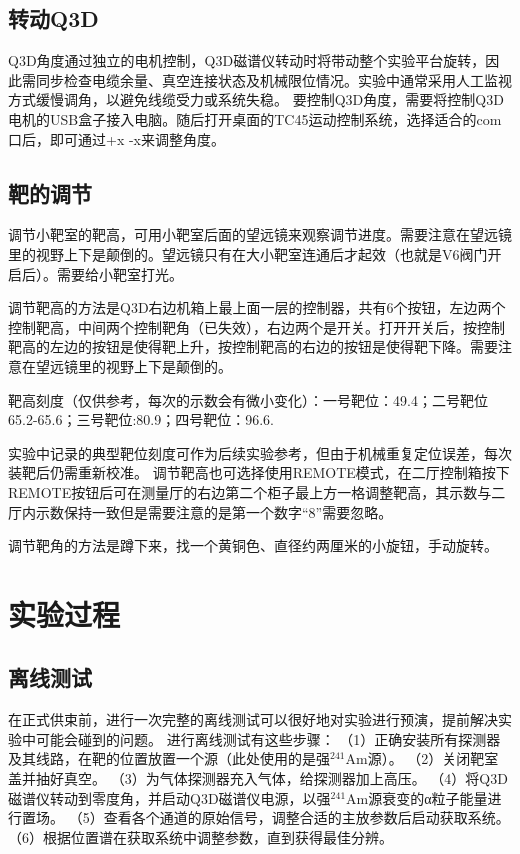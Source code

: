 \subsection{转动Q3D}
Q3D角度通过独立的电机控制，Q3D磁谱仪转动时将带动整个实验平台旋转，因此需同步检查电缆余量、真空连接状态及机械限位情况。实验中通常采用人工监视方式缓慢调角，以避免线缆受力或系统失稳。
要控制Q3D角度，需要将控制Q3D电机的USB盒子接入电脑。随后打开桌面的TC45运动控制系统，选择适合的com口后，即可通过+x -x来调整角度。
\subsection{靶的调节}


调节小靶室的靶高，可用小靶室后面的望远镜来观察调节进度。需要注意在望远镜里的视野上下是颠倒的。望远镜只有在大小靶室连通后才起效（也就是V6阀门开启后）。需要给小靶室打光。

调节靶高的方法是Q3D右边机箱上最上面一层的控制器，共有6个按钮，左边两个控制靶高，中间两个控制靶角（已失效），右边两个是开关。打开开关后，按控制靶高的左边的按钮是使得靶上升，按控制靶高的右边的按钮是使得靶下降。需要注意在望远镜里的视野上下是颠倒的。

靶高刻度（仅供参考，每次的示数会有微小变化）：一号靶位：49.4；二号靶位65.2-65.6；三号靶位:80.9；四号靶位：96.6.

实验中记录的典型靶位刻度可作为后续实验参考，但由于机械重复定位误差，每次装靶后仍需重新校准。
调节靶高也可选择使用REMOTE模式，在二厅控制箱按下REMOTE按钮后可在测量厅的右边第二个柜子最上方一格调整靶高，其示数与二厅内示数保持一致但是需要注意的是第一个数字“8”需要忽略。

调节靶角的方法是蹲下来，找一个黄铜色、直径约两厘米的小旋钮，手动旋转。
\section{实验过程}
\subsection{离线测试}
在正式供束前，进行一次完整的离线测试可以很好地对实验进行预演，提前解决实验中可能会碰到的问题。
进行离线测试有这些步骤：
（1）正确安装所有探测器及其线路，在靶的位置放置一个源（此处使用的是强$^{241}\mathrm{Am}$源）。
（2）关闭靶室盖并抽好真空。
（3）为气体探测器充入气体，给探测器加上高压。
（4）将Q3D磁谱仪转动到零度角，并启动Q3D磁谱仪电源，以强$^{241}\mathrm{Am}$源衰变的α粒子能量进行置场。
（5）查看各个通道的原始信号，调整合适的主放参数后启动获取系统。
（6）根据位置谱在获取系统中调整参数，直到获得最佳分辨。

